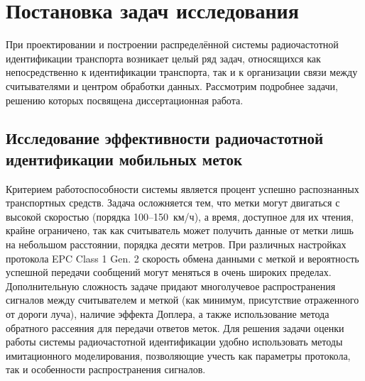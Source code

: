 



\section{Постановка задач исследования}\label{sec:ch1_problems}

При проектировании и построении распределённой системы радиочастотной идентификации транспорта возникает целый ряд задач, относящихся как непосредственно к идентификации транспорта, так и к организации связи между считывателями и центром обработки данных. Рассмотрим подробнее задачи, решению которых посвящена диссертационная работа.

\subsection{Исследование эффективности радиочастотной идентификации мобильных меток}

Критерием работоспособности системы является процент успешно распознанных транспортных средств. Задача осложняется тем, что метки могут двигаться с высокой скоростью (порядка 100--150~км/ч), а время, доступное для их чтения, крайне ограничено, так как считыватель может получить данные от метки лишь на небольшом расстоянии, порядка десяти метров. При различных настройках протокола EPC Class 1 Gen. 2 скорость обмена данными с меткой и вероятность успешной передачи сообщений могут меняться в очень широких пределах. Дополнительную сложность задаче придают многолучевое распространения сигналов между считывателем и меткой (как минимум, присутствие отраженного от дороги луча), наличие эффекта Доплера, а также использование метода обратного рассеяния для передачи ответов меток. Для решения задачи оценки работы системы радиочастотной идентификации удобно использовать методы имитационного моделирования, позволяющие учесть как параметры протокола, так и особенности распространения сигналов.

